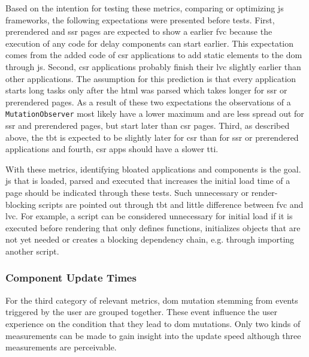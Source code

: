 \documentclass[a4paper, 10pt]{article}
\begin{document}
Based on the intention for testing these metrics, comparing or optimizing \acrlong{js} frameworks, the following expectations were presented before tests.
First, prerendered and \acrshort{ssr} pages are expected to show a earlier \acrshort{fvc} because the execution of any code for delay components can start earlier.
This expectation comes from the added code of \acrshort{csr} applications to add static elements to the \acrshort{dom} through \acrshort{js}.
Second, \acrshort{csr} applications probably finish their \acrshort{lvc} slightly earlier than other applications.
The assumption for this prediction is that every application starts long tasks only after the \acrshort{html} was parsed which takes longer for \acrshort{ssr} or prerendered pages.
As a result of these two expectations the observations of a \verb|MutationObserver| most likely have a lower maximum and are less spread out for \acrshort{ssr} and prerendered pages, but start later than \acrshort{csr} pages.
Third, as described above, the \acrshort{tbt} is expected to be slightly later for \acrshort{csr} than for \acrshort{ssr} or prerendered applications and fourth, \acrshort{csr} apps should have a slower \acrshort{tti}.

With these metrics, identifying bloated applications and components is the goal.
\acrlong{js} that is loaded, parsed and executed that increases the initial load time of a page should be indicated through these tests.
Such unnecessary or render-blocking scripts are pointed out through \acrshort{tbt} and little difference between \acrshort{fvc} and \acrshort{lvc}.
For example, a script can be considered unnecessary for initial load if it is executed before rendering that only defines functions, initializes objects that are not yet needed or creates a blocking dependency chain, e.g. through importing another script.

\subsubsection{Component Update Times}\label{subsub:componentUpdateTimes}
% 

For the third category of relevant metrics, \acrshort{dom} mutation stemming from events triggered by the user are grouped together.
These event influence the user experience on the condition that they lead to \acrshort{dom} mutations.
Only two kinds of measurements can be made to gain insight into the update speed although three measurements are perceivable.
\end{document}
